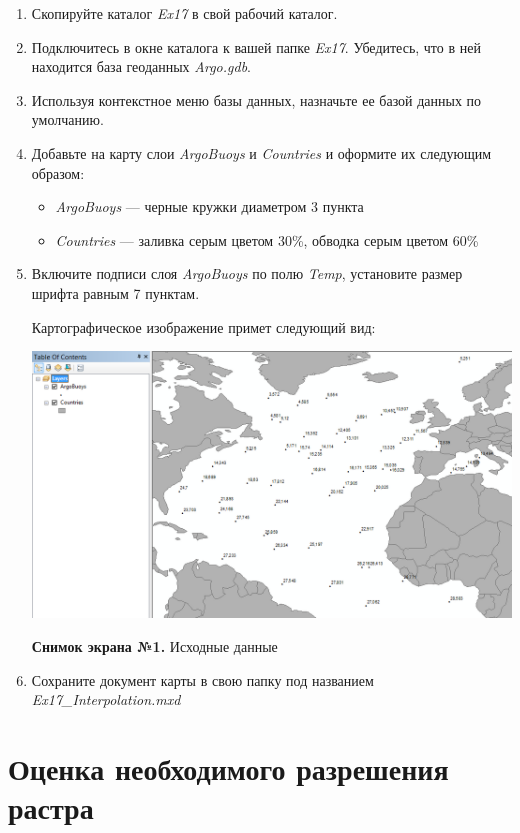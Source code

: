 \documentclass[]{book}
\providecommand{\tightlist}{%
  \setlength{\itemsep}{0pt}\setlength{\parskip}{0pt}}
\theoremstyle{definition}
\theoremstyle{definition}
\theoremstyle{definition}
\theoremstyle{remark}
\begin{document}
\begin{enumerate}
\def\labelenumi{\arabic{enumi}.}
\item
  Скопируйте каталог \emph{Ex17} в свой рабочий каталог.
\item
  Подключитесь в окне каталога к вашей папке \emph{Ex17}. Убедитесь, что
  в ней находится база геоданных \emph{Argo.gdb}.
\item
  Используя контекстное меню базы данных, назначьте ее базой данных по
  умолчанию.
\item
  Добавьте на карту слои \emph{ArgoBuoys} и \emph{Countries} и оформите
  их следующим образом:

  \begin{itemize}
  \tightlist
  \item
    \emph{ArgoBuoys} --- черные кружки диаметром 3 пункта
  \item
    \emph{Countries} --- заливка серым цветом 30\%, обводка серым цветом
    60\%
  \end{itemize}
\item
  Включите подписи слоя \emph{ArgoBuoys} по полю \emph{Temp}, установите
  размер шрифта равным 7 пунктам.

  Картографическое изображение примет следующий вид:

  \includegraphics{images/Ex17/image7.png}

  \textbf{Снимок экрана №1.} Исходные данные
\item
  Сохраните документ карты в свою папку под названием
  \emph{Ex17\_Interpolation.mxd}
\end{enumerate}

\hypertarget{interpolation-resolution}{%
\section{Оценка необходимого разрешения
растра}\label{interpolation-resolution}}
\end{document}
